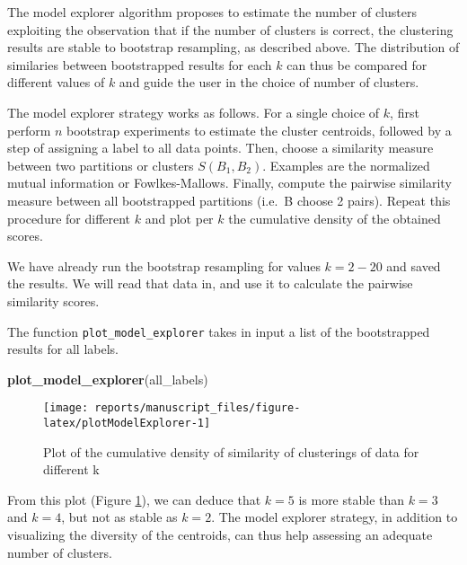 \documentclass[9pt,a4paper,]{extarticle}
\newenvironment{Shaded}{\begin{snugshade}}{\end{snugshade}}
\newcommand{\KeywordTok}[1]{\textcolor[rgb]{0.13,0.29,0.53}{\textbf{#1}}}
\newcommand{\NormalTok}[1]{#1}
\begin{document}
The model explorer algorithm \citep{ben-hur:stability} proposes to estimate the
number of clusters exploiting the observation that if the number of clusters
is correct, the clustering results are stable to bootstrap resampling, as
described above. The distribution of similaries between bootstrapped results
for each \(k\) can thus be compared for different values of \(k\) and guide the
user in the choice of number of clusters.

The model explorer strategy works as follows. For a single choice of \(k\),
first perform \(n\) bootstrap experiments to estimate the cluster centroids,
followed by a step of assigning a label to all data points. Then, choose a
similarity measure between two partitions or clusters \(S(B_1, B_2)\). Examples
are the normalized mutual information or Fowlkes-Mallows. Finally, compute the
pairwise similarity measure between all bootstrapped partitions (i.e.~B choose
2 pairs). Repeat this procedure for different \(k\) and plot per \(k\) the
cumulative density of the obtained scores.

We have already run the bootstrap resampling for values \(k=2-20\) and saved the
results. We will read that data in, and use it to calculate the pairwise
similarity scores.

The function \texttt{plot\_model\_explorer} takes in input a list of the bootstrapped
results for all labels.

\begin{Shaded}
\begin{Highlighting}[]
\KeywordTok{plot_model_explorer}\NormalTok{(all_labels)}
\end{Highlighting}
\end{Shaded}

\begin{figure}[H]

{\centering \texttt{[image: reports/manuscript\_files/figure-latex/plotModelExplorer-1]} 

}

\caption{Plot of the cumulative density of similarity of clusterings of data for different k}\label{fig:plotModelExplorer}
\end{figure}

From this plot (Figure \ref{fig:plotModelExplorer}), we can deduce that \(k=5\)
is more stable than \(k=3\) and \(k=4\), but not as stable as \(k=2\). The model
explorer strategy, in addition to visualizing the diversity of the centroids,
can thus help assessing an adequate number of clusters.
\end{document}
